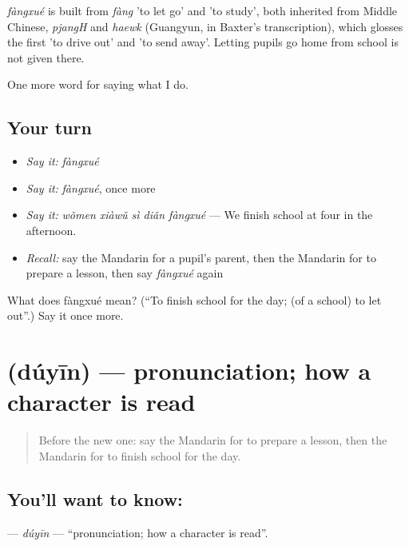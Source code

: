 \begin{cousinweb}
\emph{fàngxué} is built from \emph{fàng} 'to let go' and  'to study', both inherited from Middle Chinese, \emph{pjangH} and \emph{haewk} (Guangyun, in Baxter's transcription), which glosses the first 'to drive out' and 'to send away'. Letting pupils go home from school is not given there.
\end{cousinweb}

\begin{grammarlens}[title={What you've built}]
One more word for saying what I do.
\end{grammarlens}

\subsection*{Your turn}
\begin{itemize}
\raggedright
  \item \emph{Say it:} \emph{fàngxué}
  \item \emph{Say it:} \emph{fàngxué}, once more
  \item \emph{Say it:} \emph{wǒmen xiàwǔ sì diǎn fàngxué} — We finish school at four in the afternoon.
  \item \emph{Recall:} say the Mandarin for a pupil's parent, then the Mandarin for to prepare a lesson, then say \emph{fàngxué} again
\end{itemize}

\begin{tcolorbox}[breakable,colback=teal!4,colframe=teal!35!black,title={Before you move on}]
What does fàngxué mean? (\textquotedblleft{}To finish school for the day; (of a school) to let out\textquotedblright{}.) Say it once more.
\end{tcolorbox}
\section[\texorpdfstring{\zh{读音} (dúyīn)}{读音 (dúyīn)}]{ (dúyīn) — pronunciation; how a character is read}

\label{lesson:ZH-C249-duyin}



\begin{quote}
Before the new one: say the Mandarin for to prepare a lesson, then the Mandarin for to finish school for the day.
\end{quote}

\subsection*{You'll want to know: }
\textbf{} — \emph{dúyīn} — \textquotedblleft{}pronunciation; how a character is read\textquotedblright{}.

